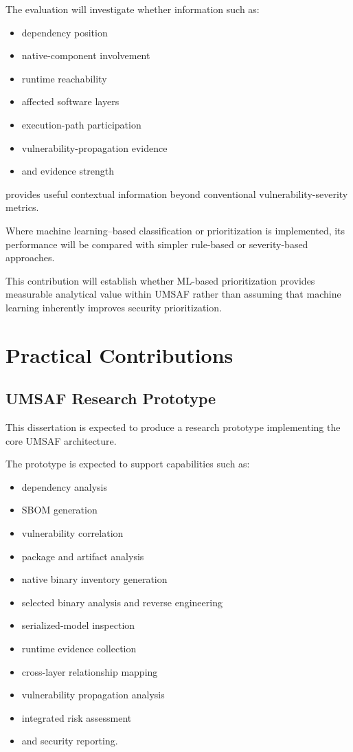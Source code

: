 \documentclass[
  12pt,
  letterpaper,
  oneside]{report}
\providecommand{\tightlist}{%
  \setlength{\itemsep}{0pt}\setlength{\parskip}{0pt}}
\begin{document}
The evaluation will investigate whether information such as:

\begin{itemize}
\tightlist
\item
  dependency position
\item
  native-component involvement
\item
  runtime reachability
\item
  affected software layers
\item
  execution-path participation
\item
  vulnerability-propagation evidence
\item
  and evidence strength
\end{itemize}

provides useful contextual information beyond conventional
vulnerability-severity metrics.

Where machine learning--based classification or prioritization is
implemented, its performance will be compared with simpler rule-based or
severity-based approaches.

This contribution will establish whether ML-based prioritization
provides measurable analytical value within UMSAF rather than assuming
that machine learning inherently improves security prioritization.

\section{Practical Contributions}\label{124-practical-contributions}

\subsection{UMSAF Research Prototype}\label{1241-umsaf-research-prototype}

This dissertation is expected to produce a research prototype
implementing the core UMSAF architecture.

The prototype is expected to support capabilities such as:

\begin{itemize}
\tightlist
\item
  dependency analysis
\item
  SBOM generation
\item
  vulnerability correlation
\item
  package and artifact analysis
\item
  native binary inventory generation
\item
  selected binary analysis and reverse engineering
\item
  serialized-model inspection
\item
  runtime evidence collection
\item
  cross-layer relationship mapping
\item
  vulnerability propagation analysis
\item
  integrated risk assessment
\item
  and security reporting.
\end{itemize}
\end{document}
